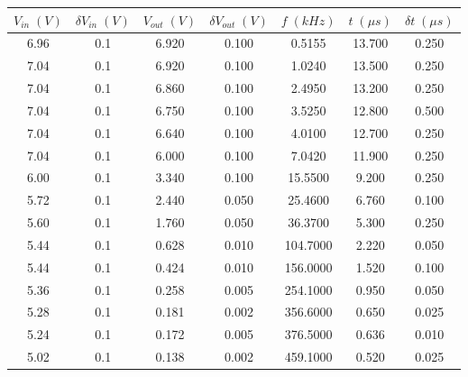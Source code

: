 \begin{tabular}{cc|cc|ccc}
\toprule
$V_{in} \; (V)$ & $\delta V_{in} \; (V)$ & $V_{out} \; (V)$ & $\delta V_{out} \; (V)$ & $f \; (kHz)$ & $t \; (\mu s)$ & $\delta t \; (\mu s)$ \\
\midrule
           6.96 &                    0.1 &            6.920 &                   0.100 &       0.5155 &         13.700 &                 0.250 \\
           7.04 &                    0.1 &            6.920 &                   0.100 &       1.0240 &         13.500 &                 0.250 \\
           7.04 &                    0.1 &            6.860 &                   0.100 &       2.4950 &         13.200 &                 0.250 \\
           7.04 &                    0.1 &            6.750 &                   0.100 &       3.5250 &         12.800 &                 0.500 \\
           7.04 &                    0.1 &            6.640 &                   0.100 &       4.0100 &         12.700 &                 0.250 \\
           7.04 &                    0.1 &            6.000 &                   0.100 &       7.0420 &         11.900 &                 0.250 \\
           6.00 &                    0.1 &            3.340 &                   0.100 &      15.5500 &          9.200 &                 0.250 \\
           5.72 &                    0.1 &            2.440 &                   0.050 &      25.4600 &          6.760 &                 0.100 \\
           5.60 &                    0.1 &            1.760 &                   0.050 &      36.3700 &          5.300 &                 0.250 \\
           5.44 &                    0.1 &            0.628 &                   0.010 &     104.7000 &          2.220 &                 0.050 \\
           5.44 &                    0.1 &            0.424 &                   0.010 &     156.0000 &          1.520 &                 0.100 \\
           5.36 &                    0.1 &            0.258 &                   0.005 &     254.1000 &          0.950 &                 0.050 \\
           5.28 &                    0.1 &            0.181 &                   0.002 &     356.6000 &          0.650 &                 0.025 \\
           5.24 &                    0.1 &            0.172 &                   0.005 &     376.5000 &          0.636 &                 0.010 \\
           5.02 &                    0.1 &            0.138 &                   0.002 &     459.1000 &          0.520 &                 0.025 \\
\bottomrule
\end{tabular}
